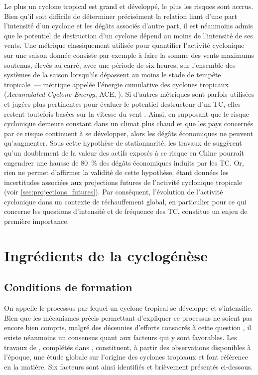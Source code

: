 \documentclass[../main.tex]{subfiles}
\begin{document}
Le plus un cyclone tropical est grand et développé, le plus les risques sont accrus. Bien qu'il soit difficile de déterminer précisément la relation liant d'une
part l'intensité d'un cyclone et les dégâts associés d'autre part, il est néanmoins admis que le potentiel de destruction d'un cyclone dépend au moins de
l'intensité de ses vents. Une métrique classiquement utilisée pour quantifier l'activité cyclonique sur une saison donnée consiste par exemple à faire la somme
des vents maximums soutenus, élevés au carré, avec une période de six heures, sur l'ensemble des systèmes de la saison lorsqu'ils dépassent au moins le stade de
tempête tropicale~--- métrique appelée l'énergie cumulative des cyclones tropicaux (\textit{Accumulated Cyclone Energy}, ACE, \cite{bell_climate_2000}). Si
d'autres métriques sont parfois utilisées et jugées plus pertinentes pour évaluer le potentiel destructeur d'un TC, elles restent toutefois basées sur la
vitesse du vent \parencite{powell_tropical_2007}. Ainsi, en supposant que le risque cyclonique demeure constant dans un climat plus chaud et que les pays
concernés par ce risque continuent à se développer, alors les dégâts économiques ne peuvent qu'augmenter. Sous cette hypothèse de stationnarité, les travaux de
\cite{ye_dependence_2020} suggèrent qu'un doublement de la valeur des actifs exposés à ce risque en Chine pourrait engendrer une hausse de \SI{80}{\percent} des
dégâts économiques induits par les TC. Or, rien ne permet d'affirmer la validité de cette hypothèse, étant données les incertitudes associées aux projections
futures de l'activité cyclonique tropicale (voir \cref{sec:projections_futures}). Par conséquent, l'évolution de l'activité cyclonique dans un contexte de
réchauffement global, en particulier pour ce qui concerne les questions d'intensité et de fréquence des TC, constitue un enjeu de première importance.

\section{Ingrédients de la cyclogénèse}
  
\subsection{Conditions de formation}\label{sec:conditions_cyclogenese}

On appelle  le processus par lequel un cyclone tropical se développe et s'intensifie. Bien que les mécanismes précis permettant
d'expliquer ce processus ne soient pas encore bien compris, malgré des décennies d'efforts consacrés à cette question \parencite{yanai_formation_1964,
montgomery_tropical_1993, gray_formation_1998, tory_tropical_2010}, il existe néanmoins un consensus quant aux facteurs qui y sont favorables. Les travaux de
\cite{gray_global_1968}, complétés dans \cite{gray_tropical_1975}, constituent, à partir des observations disponibles à l'époque, une étude globale sur
l'origine des cyclones tropicaux et font référence en la matière. Six facteurs sont ainsi identifiés et brièvement présentés ci-dessous.
\end{document}
